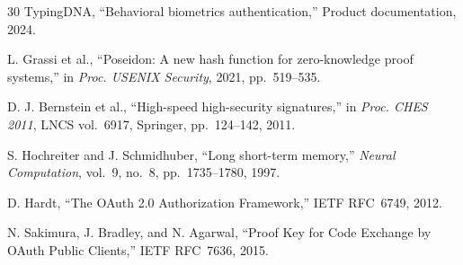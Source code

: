 \documentclass[12pt,a4paper,oneside]{report}
\begin{document}
\begin{thebibliography}{30}
TypingDNA, ``Behavioral biometrics authentication,'' Product documentation, 2024.

L. Grassi et al., ``Poseidon: A new hash function for zero-knowledge proof systems,''
in \textit{Proc. USENIX Security}, 2021, pp.~519--535.

D. J. Bernstein et al., ``High-speed high-security signatures,'' in \textit{Proc.
CHES 2011}, LNCS vol.~6917, Springer, pp.~124--142, 2011.

S. Hochreiter and J. Schmidhuber, ``Long short-term memory,''
\textit{Neural Computation}, vol.~9, no.~8, pp.~1735--1780, 1997.

D. Hardt, ``The OAuth 2.0 Authorization Framework,'' IETF RFC~6749, 2012.

N. Sakimura, J. Bradley, and N. Agarwal, ``Proof Key for Code Exchange by
OAuth Public Clients,'' IETF RFC~7636, 2015.

\end{thebibliography}
\end{document}
